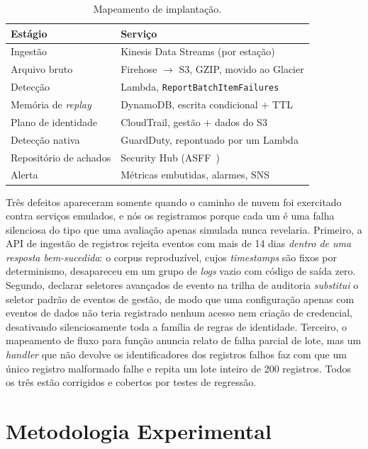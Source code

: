 \documentclass[conference]{IEEEtran}
\begin{document}
\begin{table}[t]
\caption{Mapeamento de implantação.}
\label{tab:aws}
\centering
\footnotesize
\begin{tabular}{@{}ll@{}}
\toprule
\textbf{Estágio} & \textbf{Serviço} \\
\midrule
Ingestão & Kinesis Data Streams (por estação) \\
Arquivo bruto & Firehose $\rightarrow$ S3, GZIP, movido ao Glacier \\
Detecção & Lambda, \texttt{ReportBatchItemFailures} \\
Memória de \emph{replay} & DynamoDB, escrita condicional $+$ TTL \\
Plano de identidade & CloudTrail, gestão $+$ dados do S3 \\
Detecção nativa & GuardDuty, repontuado por um Lambda \\
Repositório de achados & Security Hub (ASFF~\cite{asff}) \\
Alerta & Métricas embutidas, alarmes, SNS \\
\bottomrule
\end{tabular}
\end{table}

Três defeitos apareceram somente quando o caminho de nuvem foi exercitado contra
serviços emulados, e nós os registramos porque cada um é uma falha silenciosa do
tipo que uma avaliação apenas simulada nunca revelaria. Primeiro, a API de
ingestão de registros rejeita eventos com mais de 14 dias \emph{dentro de uma
resposta bem-sucedida}: o corpus reproduzível, cujos \emph{timestamps} são fixos
por determinismo, desapareceu em um grupo de \emph{logs} vazio com código de
saída zero. Segundo, declarar seletores avançados de evento na trilha de
auditoria \emph{substitui} o seletor padrão de eventos de gestão, de modo que
uma configuração apenas com eventos de dados não teria registrado nenhum acesso
nem criação de credencial, desativando silenciosamente toda a família de regras
de identidade. Terceiro, o mapeamento de fluxo para função anuncia relato de
falha parcial de lote, mas um \emph{handler} que não devolve os identificadores
dos registros falhos faz com que um único registro malformado falhe e repita um
lote inteiro de 200 registros. Todos os três estão corrigidos e cobertos por
testes de regressão.

\section{Metodologia Experimental}
\label{sec:method}
\end{document}
